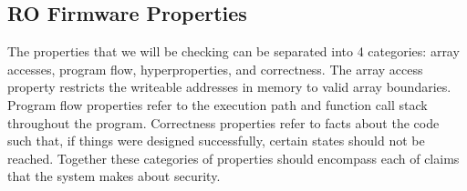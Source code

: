 \documentclass[../report.tex]{subfiles}
\begin{document}
%
%


\subsection{RO Firmware Properties}

The properties that we will be checking can be separated into 4 categories: array accesses, program flow, hyperproperties, and correctness.
The array access property restricts the writeable addresses in memory to valid array boundaries. 
Program flow properties refer to the execution path and function call stack throughout the program.
Correctness properties refer to facts about the code such that, if things were
designed successfully, certain states should not be reached.
Together these categories of properties should encompass each of claims that the system makes about security.
\end{document}
